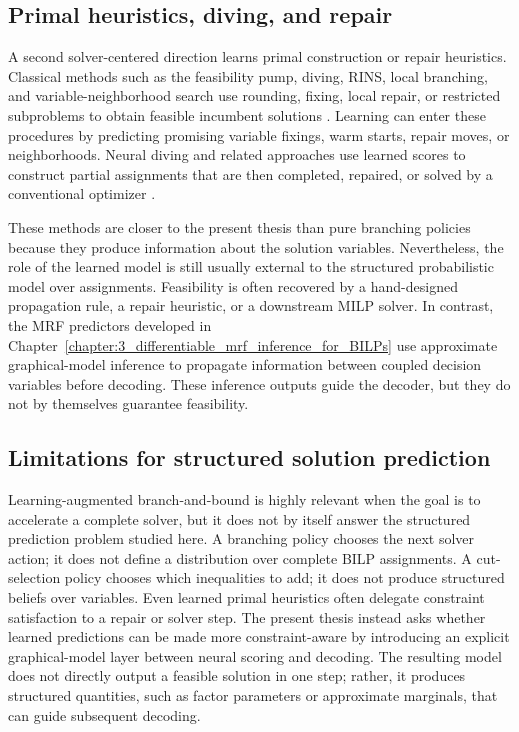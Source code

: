 \subsection{Primal heuristics, diving, and repair}
\label{subsec:rw_primal_heuristics}

A second solver-centered direction learns primal construction or repair heuristics. Classical methods such as the feasibility pump, diving, RINS, local branching, and variable-neighborhood search use rounding, fixing, local repair, or restricted subproblems to obtain feasible incumbent solutions \cite{fischetti_feasibility_2005,battiti_learning_2017}. Learning can enter these procedures by predicting promising variable fixings, warm starts, repair moves, or neighborhoods. Neural diving and related approaches use learned scores to construct partial assignments that are then completed, repaired, or solved by a conventional optimizer \cite{nair_solving_2020}.

These methods are closer to the present thesis than pure branching policies because they produce information about the solution variables. Nevertheless, the role of the learned model is still usually external to the structured probabilistic model over assignments. Feasibility is often recovered by a hand-designed propagation rule, a repair heuristic, or a downstream MILP solver. In contrast, the MRF predictors developed in Chapter~\ref{chapter:3_differentiable_mrf_inference_for_BILPs} use approximate graphical-model inference to propagate information between coupled decision variables before decoding. These inference outputs guide the decoder, but they do not by themselves guarantee feasibility.

\subsection{Limitations for structured solution prediction}
\label{subsec:rw_solver_guidance_limitations}

Learning-augmented branch-and-bound is highly relevant when the goal is to accelerate a complete solver, but it does not by itself answer the structured prediction problem studied here. A branching policy chooses the next solver action; it does not define a distribution over complete BILP assignments. A cut-selection policy chooses which inequalities to add; it does not produce structured beliefs over variables. Even learned primal heuristics often delegate constraint satisfaction to a repair or solver step. The present thesis instead asks whether learned predictions can be made more constraint-aware by introducing an explicit graphical-model layer between neural scoring and decoding. The resulting model does not directly output a feasible solution in one step; rather, it produces structured quantities, such as factor parameters or approximate marginals, that can guide subsequent decoding.

